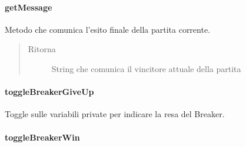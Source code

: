 \documentclass[letterpaper,10pt,italian,openany,oneside]{sphinxmanual}
\begin{document}
\paragraph{getMessage}
\label{\detokenize{source/it/unicam/cs/pa/mastermind/gamecore/MatchState:getmessage}}

\begin{fulllineitems}
\label{\detokenize{source/it/unicam/cs/pa/mastermind/gamecore/MatchState:it.unicam.cs.pa.mastermind.gamecore.MatchState.getMessage()}}
Metodo che comunica l’esito finale della partita corrente.
\begin{quote}\begin{description}
\item[{Ritorna}] \leavevmode
String che comunica il vincitore attuale della partita

\end{description}\end{quote}

\end{fulllineitems}



\paragraph{toggleBreakerGiveUp}
\label{\detokenize{source/it/unicam/cs/pa/mastermind/gamecore/MatchState:togglebreakergiveup}}

\begin{fulllineitems}
\label{\detokenize{source/it/unicam/cs/pa/mastermind/gamecore/MatchState:it.unicam.cs.pa.mastermind.gamecore.MatchState.toggleBreakerGiveUp()}}
Toggle sulle variabili private per indicare la resa del Breaker.

\end{fulllineitems}



\paragraph{toggleBreakerWin}
\label{\detokenize{source/it/unicam/cs/pa/mastermind/gamecore/MatchState:togglebreakerwin}}
\end{document}
